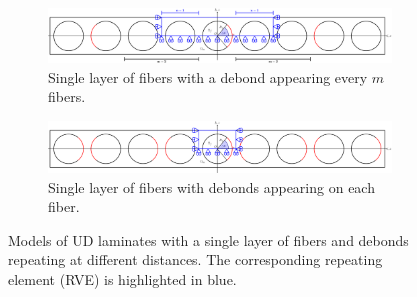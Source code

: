 \documentclass[review]{elsarticle}
\begin{document}
\begin{figure}[!h]
\centering
    \begin{subfigure}[b]{\textwidth}
        \includegraphics[width=\textwidth]{freeThinPly.pdf}
        \caption{Single layer of fibers with a debond appearing every $m$ fibers.}\label{subfig:freethinply}
    \end{subfigure}

    \begin{subfigure}[b]{\textwidth}
        \includegraphics[width=\textwidth]{freeThinPlyAllDebonds.pdf}
        \caption{Single layer of fibers with debonds appearing on each fiber.}\label{subfig:freethinplyalldebonds}
    \end{subfigure} 

\caption{Models of UD laminates with a single layer of fibers and debonds repeating at different distances. The corresponding repeating element (RVE) is highlighted in blue.}\label{fig:laminateModelsA}
\end{figure}
\end{document}
